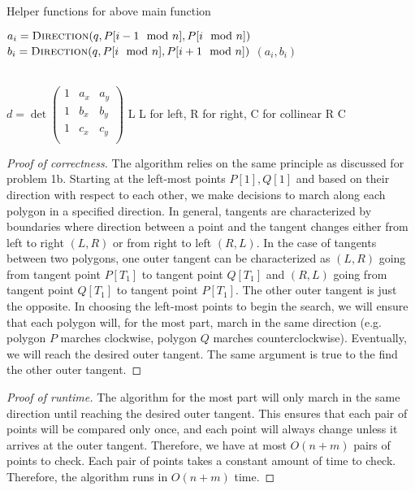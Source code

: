 \documentclass{article}
\begin{document}
\begin{algorithm}[H]
\caption{Helper functions for above main function}
\begin{algorithmic}[1]

\State $a_i = \textsc{Direction}(q, P[i-1 \mod n], P[i \mod n])$
\State $b_i = \textsc{Direction}(q, P[i \mod n], P[i+1 \mod n])$
\State \Return $(a_i,b_i)$

\EndFunction
\\
\State $d = \det
	\begin{pmatrix}
	1 & a_x & a_y \\
	1 & b_x & b_y \\
	1 & c_x & c_y \\
	\end{pmatrix}
	$
 \Return L \Comment L for left, R for right, C for collinear 
\EndIf
{} \Return R \EndIf
{} \Return C \EndIf
\EndFunction
\end{algorithmic}
\end{algorithm}

\begin{proof}[Proof of correctness]
The algorithm relies on the same principle as discussed for problem 1b. Starting at the left-most points $P[1],Q[1]$ and based on their direction with respect to each other, we make decisions to march along each polygon in a specified direction. In general, tangents are characterized by boundaries where direction between a point and the tangent changes either from left to right $(L,R)$ or from right to left $(R,L)$. In the case of tangents between two polygons, one outer tangent can be characterized as $(L,R)$ going from tangent point $P[T_1]$ to tangent point $Q[T_1]$ and $(R,L)$ going from tangent point $Q[T_1] $ to tangent point $P[T_1]$. The other outer tangent is just the opposite. In choosing the left-most points to begin the search, we will ensure that each polygon will, for the most part, march in the same direction (e.g. polygon $P$ marches clockwise, polygon $Q$ marches counterclockwise). Eventually, we will reach the desired outer tangent. The same argument is true to the find the other outer tangent.
\end{proof}

\begin{proof}[Proof of runtime]
The algorithm for the most part will only march in the same direction until reaching the desired outer tangent. This ensures that each pair of points will be compared only once, and each point will always change unless it arrives at the outer tangent. Therefore, we have at most $O(n+m)$ pairs of points to check. Each pair of points takes a constant amount of time to check. Therefore, the algorithm runs in $O(n+m)$ time.
\end{proof}
\end{document}
